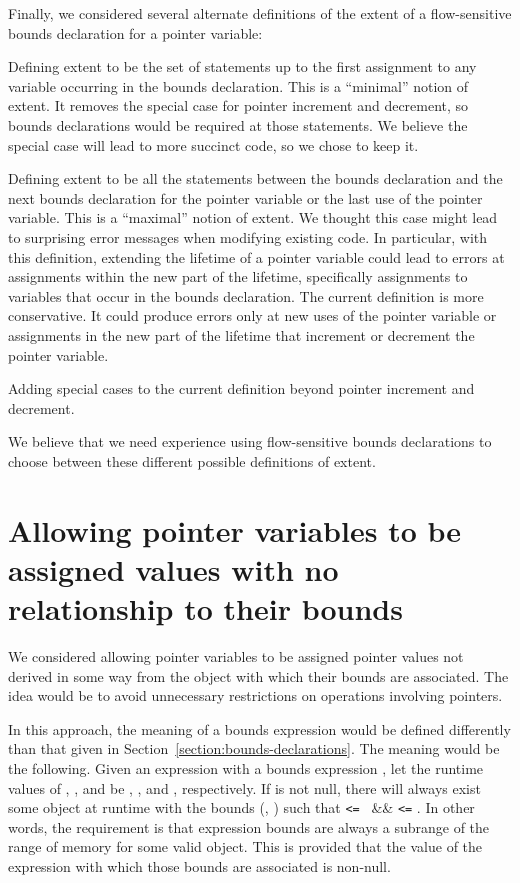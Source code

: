 Finally, we considered several alternate definitions of the extent of a
flow-sensitive bounds declaration for a pointer variable:
\begin{compactitem}
    \item Defining extent to be the set of statements up to the first assignment
          to any variable occurring in the bounds declaration.   This is a
          ``minimal'' notion of extent.  It removes the special case for
          pointer increment and decrement, so bounds
          declarations would be required at those statements.  We believe
          the special case will lead to more succinct code, so we chose to
          keep it.
    \item Defining extent to be all the statements between the bounds
          declaration and the next bounds declaration for
         the pointer variable or the last use of the pointer variable.  This
         is a ``maximal'' notion of extent.  We thought this case might
         lead to surprising error messages when modifying existing
         code.  In particular, with this definition, extending
         the lifetime of a pointer variable could lead to errors
         at assignments within the new part of the lifetime, specifically
         assignments to variables that occur in the bounds declaration.
         The current definition is more conservative.  It could produce errors
         only at new uses of the pointer variable or assignments in
         the new part of the lifetime that increment or decrement the pointer 
         variable.
  \item Adding special cases to the current definition beyond
        pointer increment and decrement.  
\end{compactitem}
We believe that we need experience using flow-sensitive bounds declarations
to choose between these different possible definitions of extent.

\section{Allowing pointer variables to be assigned values with no relationship to their bounds}

We considered allowing pointer variables to be assigned pointer values
not derived in some way from the object with which their bounds are
associated. The idea would be to avoid unnecessary restrictions on
operations involving pointers.

In this approach, the meaning of a bounds expression would be defined
differently than that given in Section~\ref{section:bounds-declarations}. 
The meaning would be the
following. Given an expression  with a bounds expression
, let the runtime
values of , , and  be , ,
and , respectively. If  is not null, there will
always exist some object at runtime with the bounds (,
) such that  \texttt{<=} \ \&\&
 \texttt{<=} . In other words, the
requirement is that expression bounds are always a subrange of the range
of memory for some valid object. This is provided that the value of the
expression with which those bounds are associated is non-null.

